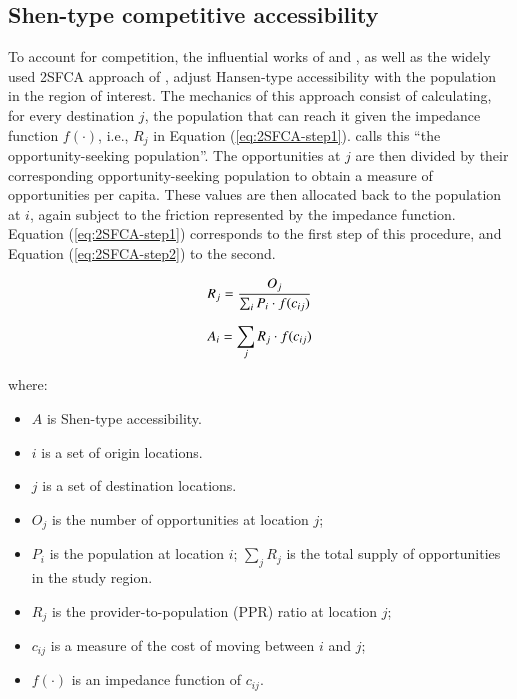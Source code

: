 \documentclass[]{elsarticle} %
\providecommand{\tightlist}{%
  \setlength{\itemsep}{0pt}\setlength{\parskip}{0pt}}
\begin{document}
\hypertarget{shen-type-competitive-accessibility}{%
\subsection{Shen-type competitive
accessibility}\label{shen-type-competitive-accessibility}}

To account for competition, the influential works of \citet{shen1998}
and \citet{weibull_axiomatic_1976}, as well as the widely used 2SFCA
approach of \citet{luo2003}, adjust Hansen-type accessibility with the
population in the region of interest. The mechanics of this approach
consist of calculating, for every destination \(j\), the population that
can reach it given the impedance function \(f(\cdot)\), i.e., \(R_j\) in
Equation (\ref{eq:2SFCA-step1}). \citet{shen1998} calls this ``the
opportunity-seeking population''. The opportunities at \(j\) are then
divided by their corresponding opportunity-seeking population to obtain
a measure of opportunities per capita. These values are then allocated
back to the population at \(i\), again subject to the friction
represented by the impedance function. Equation (\ref{eq:2SFCA-step1})
corresponds to the first step of this procedure, and Equation
(\ref{eq:2SFCA-step2}) to the second.

\begin{equation}
\label{eq:2SFCA-step1}
R_{j} = \frac{O_{j}}{\sum_i P_{i} \cdot f(c_{ij})}\\
\end{equation}

\begin{equation}
\label{eq:2SFCA-step2}
A_{i} = {\sum_j R_{j} \cdot f(c_{ij})}\\
\end{equation}

\noindent where:

\begin{itemize}
\tightlist
\item
  \(A\) is Shen-type accessibility.
\item
  \(i\) is a set of origin locations.
\item
  \(j\) is a set of destination locations.
\item
  \(O_j\) is the number of opportunities at location \(j\);
\item
  \(P_i\) is the population at location \(i\); \(\sum_j R_j\) is the
  total supply of opportunities in the study region.
\item
  \(R_j\) is the provider-to-population (PPR) ratio at location \(j\);
\item
  \(c_{ij}\) is a measure of the cost of moving between \(i\) and \(j\);
\item
  \(f(\cdot)\) is an impedance function of \(c_{ij}\).
\end{itemize}
\end{document}
